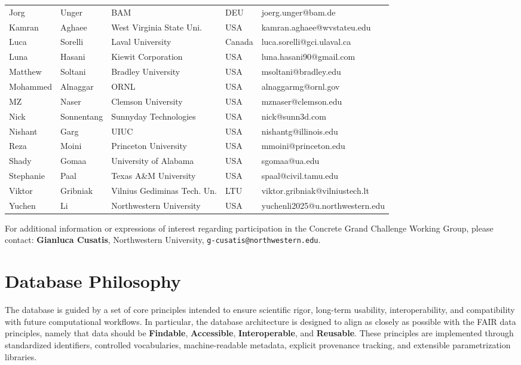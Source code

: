 \documentclass[11pt]{book}
\begin{document}
\begin{longtable}{p{}p{}p{}p{}p{}}
Jorg & Unger & BAM & DEU & joerg.unger@bam.de \\
Kamran & Aghaee & West Virginia State Uni. & USA & kamran.aghaee@wvstateu.edu \\
Luca & Sorelli & Laval University & Canada & luca.sorelli@gci.ulaval.ca \\
Luna & Hasani & Kiewit Corporation & USA & luna.hasani90@gmail.com \\
Matthew & Soltani & Bradley University & USA & msoltani@bradley.edu \\
Mohammed & Alnaggar & ORNL & USA & alnaggarmg@ornl.gov \\
MZ & Naser & Clemson University & USA & mznaser@clemson.edu \\
Nick & Sonnentang & Sunnyday Technologies & USA & nick@sunn3d.com \\
Nishant & Garg & UIUC & USA & nishantg@illinois.edu \\
Reza & Moini & Princeton University & USA & mmoini@princeton.edu \\
Shady & Gomaa & University of Alabama & USA & sgomaa@ua.edu \\
Stephanie & Paal & Texas A\&M University & USA & spaal@civil.tamu.edu \\
Viktor & Gribniak & Vilnius Gediminas Tech. Un. & LTU & viktor.gribniak@vilniustech.lt \\
Yuchen & Li & Northwestern University & USA & yuchenli2025@u.northwestern.edu \\
\hline
\end{longtable}


\noindent
For additional information or expressions of interest regarding participation in the Concrete Grand Challenge Working Group, please contact: \textbf{Gianluca Cusatis}, Northwestern University, \texttt{g-cusatis@northwestern.edu}.
\normalsize


\newpage
\chapter{Database Philosophy}

The database is guided by a set of core principles intended to ensure scientific rigor, long-term usability, interoperability, and compatibility with future computational workflows. In particular, the database architecture is designed to align as closely as possible with the FAIR data principles, namely that data should be \textbf{Findable}, \textbf{Accessible}, \textbf{Interoperable}, and \textbf{Reusable}. These principles are implemented through standardized identifiers, controlled vocabularies, machine-readable metadata, explicit provenance tracking, and extensible parametrization libraries.
\end{document}
